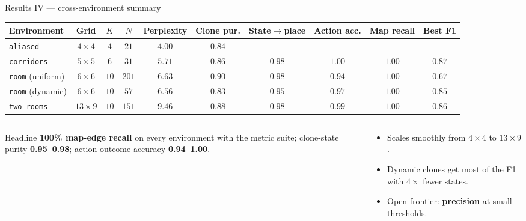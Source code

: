 \documentclass[aspectratio=169,10pt]{beamer}
\begin{document}
\begin{frame}{Results IV --- cross-environment summary}
  \centering
  \scriptsize
  \begin{tabular}{@{}lccccccccc@{}}
    \toprule
    \textbf{Environment} & \textbf{Grid} & \textbf{$K$} & \textbf{$N$} &
    \textbf{Perplexity} & \textbf{Clone pur.} &
    \textbf{State$\to$place} & \textbf{Action acc.} &
    \textbf{Map recall} & \textbf{Best F1}\\
    \midrule
    \texttt{aliased}        & $4\times4$  & $4$  & $21$  & $4.00$ & $0.84$ & --- & --- & --- & ---\\
    \texttt{corridors}      & $5\times5$  & $6$  & $31$  & $5.71$ & $0.86$ & $0.98$ & $\mathbf{1.00}$ & $1.00$ & $\mathbf{0.87}$\\
    \texttt{room} (uniform) & $6\times6$  & $10$ & $201$ & $6.63$ & $\mathbf{0.90}$ & $0.98$ & $0.94$ & $1.00$ & $0.67$\\
    \texttt{room} (dynamic) & $6\times6$  & $10$ & $57$  & $6.56$ & $0.83$ & $0.95$ & $0.97$ & $1.00$ & $0.85$\\
    \texttt{two\_rooms}     & $13\times9$ & $10$ & $151$ & $9.46$ & $0.88$ & $0.98$ & $0.99$ & $1.00$ & $0.86$\\
    \bottomrule
  \end{tabular}

  \vspace{0.9em}
  \begin{columns}[T,onlytextwidth]
    \begin{column}{0.5\textwidth}
      \begin{block}{Headline}
        \textbf{100\% map-edge recall} on every environment with the metric
        suite; clone-state purity \textbf{0.95--0.98}; action-outcome accuracy
        \textbf{0.94--1.00}.
      \end{block}
    \end{column}
    \begin{column}{0.5\textwidth}
      \begin{itemize}\small\setlength\itemsep{0.15em}
        \item Scales smoothly from $4{\times}4$ to $13{\times}9$.
        \item Dynamic clones get most of the F1 with $4\times$ fewer states.
        \item Open frontier: \textbf{precision} at small thresholds.
      \end{itemize}
    \end{column}
  \end{columns}
\end{frame}
\end{document}
